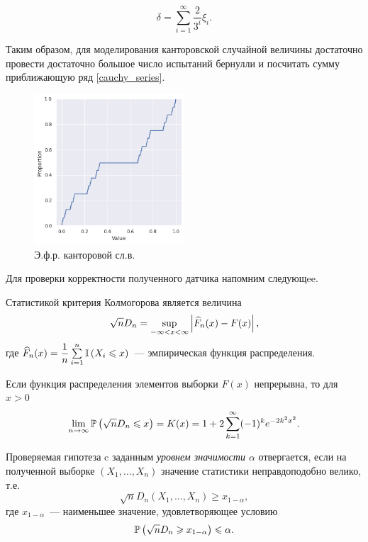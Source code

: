         \begin{equation}\label{cauchy_series}
            \delta = \sum\limits_{i = 1}^{\infty} \dfrac{2}{3^i}\xi_i.
        \end{equation}

        Таким образом, для моделирования канторовской случайной величины 
        достаточно провести достаточно большое число испытаний бернулли и 
        посчитать сумму приближающую ряд \eqref{cauchy_series}.

        \begin{figure}[tbp]
            \centering
            \includegraphics[width=0.5\textwidth]{resources/task2_cantor.png}
            \caption{Э.ф.р. канторовой сл.в.}
            \label{task1_cantor}
        \end{figure}
        
        \bigskip
        
        Для проверки корректности полученного датчика напомним следующee.

        Статистикой критерия Колмогорова является величина 
        \[\sqrt{n}D_n = \sup\limits_{-\infty < x < \infty} 
                                                \left|\widehat F_n(x) - F(x)\right|,\]
        где $\widehat F_n(x) = \dfrac{1}{n}\sum\limits_{i=1}^{n} 
        \mathbb{I}\left(X_i \leqslant x\right)$~--- эмпирическая функция распределения.

        \begin{theorem}[Колмогоров] Если функция распределения элементов выборки 
            $F(x)$ непрерывна, то для $x > 0$
            \[\lim_{n\rightarrow\infty}\mathbb{P}\left(\sqrt{n}D_n \leqslant x\right) = K(x) = 
            1 + 2\sum\limits_{k=1}^{\infty}(-1)^k e^{-2k^2 x^2}.\]
        \end{theorem}

        Проверяемая гипотеза c заданным \emph{уровнем значимости $\alpha$} 
        отвергается, если на полученной выборке $(X_1,\ldots,X_n)$ значение 
        статистики неправдоподобно велико, т.е.
        \begin{equation}\label{rej_cond}
            \sqrt{n}D_n(X_1,\ldots,X_n) \ge x_{1-\alpha},
        \end{equation}
        где $x_{1-\alpha}$~--- наименьшее значение, удовлетворяющее условию
        \[\mathbb{P}\left(\sqrt{n}D_n \geqslant x_{1-\alpha}\right) \leqslant \alpha.\]

